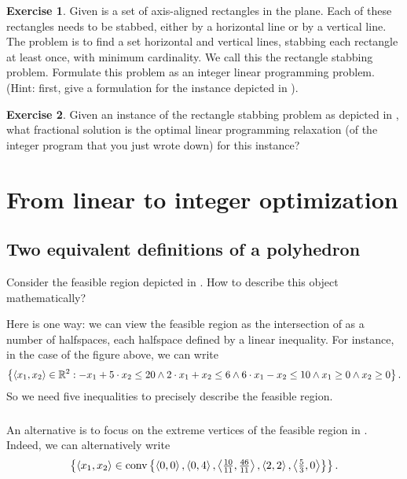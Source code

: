 \documentclass[titlepage]{book}
\theoremstyle{plain}
\theoremstyle{definition}
\newtheorem{exercise}{Exercise}[chapter]
\theoremstyle{remark}
\begin{document}
\begin{exercise}
Given is a set of axis-aligned rectangles in the plane. Each of these rectangles needs to be stabbed, either by a horizontal line or by a vertical line. The problem is to find a set horizontal and vertical lines, stabbing each rectangle at least once, with minimum cardinality. We call this the rectangle stabbing problem. Formulate this problem as an integer linear programming problem. (Hint: first, give a formulation for the instance depicted in ).
\end{exercise}
\begin{exercise}
Given an instance of the rectangle stabbing problem as depicted in , what fractional solution is the optimal linear programming relaxation (of the integer program that you just wrote down) for this instance?
\end{exercise}


\chapter{From linear to integer optimization}

\section{Two equivalent definitions of a polyhedron}

Consider the feasible region depicted in . How to describe this object mathematically?


Here is one way: we can view the feasible region as the intersection of as a number of halfspaces, each halfspace defined by a linear inequality. For instance, in the case of the figure above, we can write
\begin{equation}
\left\{ \left\langle x_1,x_2 \right\rangle\in\mathbb{R}^2: -x_1+5\cdot x_2\leq 20 \wedge 2\cdot x_1+x_2\leq 6\wedge 6\cdot x_1-x_2\leq 10\wedge x_1\geq 0\wedge x_2\geq 0 \right\}.
\end{equation}
So we need five inequalities to precisely describe the feasible region.

\paragraph{}
An alternative is to focus on the extreme vertices of the feasible region in . Indeed, we can alternatively write
\begin{equation}
\left\{ \left\langle x_1,x_2 \right\rangle\in\mbox{conv}\left\{ \left\langle 0,0 \right\rangle,\left\langle 0,4 \right\rangle,\left\langle \tfrac{10}{11},\tfrac{46}{11} \right\rangle,\left\langle 2,2 \right\rangle,\left\langle \tfrac{5}{3},0 \right\rangle \right\} \right\}.
\end{equation}
\end{document}

